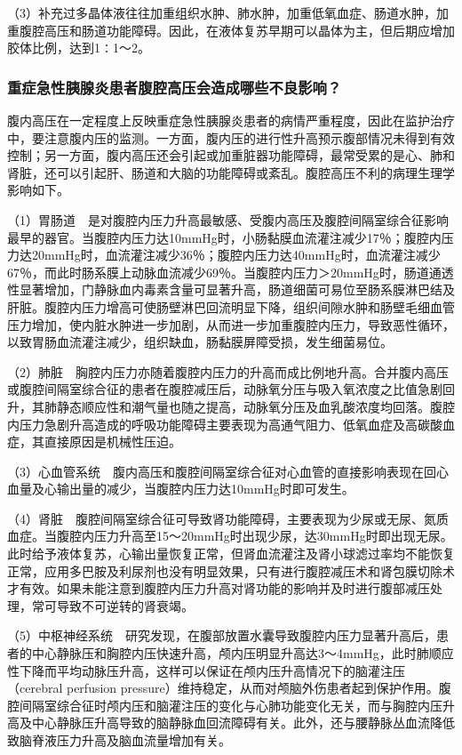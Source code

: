 （3）补充过多晶体液往往加重组织水肿、肺水肿，加重低氧血症、肠道水肿，加重腹腔高压和肠道功能障碍。因此，在液体复苏早期可以晶体为主，但后期应增加胶体比例，达到1∶1～2。

\subsubsection{重症急性胰腺炎患者腹腔高压会造成哪些不良影响？}

腹内高压在一定程度上反映重症急性胰腺炎患者的病情严重程度，因此在监护治疗中，要注意腹内压的监测。一方面，腹内压的进行性升高预示腹部情况未得到有效控制；另一方面，腹内高压还会引起或加重脏器功能障碍，最常受累的是心、肺和肾脏，还可以引起肝、肠道和大脑的功能障碍或紊乱。腹腔高压不利的病理生理学影响如下。

（1）胃肠道　是对腹腔内压力升高最敏感、受腹内高压及腹腔间隔室综合征影响最早的器官。当腹腔内压力达10mmHg时，小肠黏膜血流灌注减少17％；腹腔内压力达20mmHg时，血流灌注减少36％；腹腔内压力达40mmHg时，血流灌注减少67％，而此时肠系膜上动脉血流减少69％。当腹腔内压力＞20mmHg时，肠道通透性显著增加，门静脉血内毒素含量可显著升高，肠道细菌可易位至肠系膜淋巴结及肝脏。腹腔内压力增高可使肠壁淋巴回流明显下降，组织间隙水肿和肠壁毛细血管压力增加，使内脏水肿进一步加剧，从而进一步加重腹腔内压力，导致恶性循环，以致胃肠血流灌注减少，组织缺血，肠黏膜屏障受损，发生细菌易位。

（2）肺脏　胸腔内压力亦随着腹腔内压力的升高而成比例地升高。合并腹内高压或腹腔间隔室综合征的患者在腹腔减压后，动脉氧分压与吸入氧浓度之比值急剧回升，其肺静态顺应性和潮气量也随之提高，动脉氧分压及血乳酸浓度均回落。腹腔内压力急剧升高造成的呼吸功能障碍主要表现为高通气阻力、低氧血症及高碳酸血症，其直接原因是机械性压迫。

（3）心血管系统　腹内高压和腹腔间隔室综合征对心血管的直接影响表现在回心血量及心输出量的减少，当腹腔内压力达10mmHg时即可发生。

（4）肾脏　腹腔间隔室综合征可导致肾功能障碍，主要表现为少尿或无尿、氮质血症。当腹腔内压力升高至15～20mmHg时出现少尿，达30mmHg时即出现无尿。此时给予液体复苏，心输出量恢复正常，但肾血流灌注及肾小球滤过率均不能恢复正常，应用多巴胺及利尿剂也没有明显效果，只有进行腹腔减压术和肾包膜切除术才有效。如果未能注意到腹腔内压力升高对肾功能的影响并及时进行腹部减压处理，常可导致不可逆转的肾衰竭。

（5）中枢神经系统　研究发现，在腹部放置水囊导致腹腔内压力显著升高后，患者的中心静脉压和胸腔内压快速升高，颅内压明显升高达3～4mmHg，此时肺顺应性下降而平均动脉压升高，这样可以保证在颅内压升高情况下的脑灌注压（cerebral
perfusion
pressure）维持稳定，从而对颅脑外伤患者起到保护作用。腹腔间隔室综合征时颅内压和脑灌注压的变化与心肺功能变化无关，而与胸腔内压升高及中心静脉压升高导致的脑静脉血回流障碍有关。此外，还与腰静脉丛血流降低致脑脊液压力升高及脑血流量增加有关。

